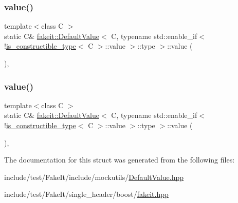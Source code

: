 \subsubsection{\texorpdfstring{value()}{value()}\hspace{0.1cm}{\footnotesize\ttfamily [8/9]}}
{\footnotesize\ttfamily template$<$class C $>$ \\
static C\& \mbox{\hyperlink{structfakeit_1_1DefaultValue}{fakeit\+::\+Default\+Value}}$<$ C, typename std\+::enable\+\_\+if$<$!\mbox{\hyperlink{structfakeit_1_1is__constructible__type}{is\+\_\+constructible\+\_\+type}}$<$ C $>$\+::value $>$\+::type $>$\+::value (\begin{DoxyParamCaption}{ }\end{DoxyParamCaption})\hspace{0.3cm}{\ttfamily [inline]}, {\ttfamily [static]}}

\mbox{\label{structfakeit_1_1DefaultValue_3_01C_00_01typename_01std_1_1enable__if_3_9is__constructible__type_237d75e2cfb810085e1504a1340d5949_ace6890104d79eccdf278ceb3b8d1d887}} 
\subsubsection{\texorpdfstring{value()}{value()}\hspace{0.1cm}{\footnotesize\ttfamily [9/9]}}
{\footnotesize\ttfamily template$<$class C $>$ \\
static C\& \mbox{\hyperlink{structfakeit_1_1DefaultValue}{fakeit\+::\+Default\+Value}}$<$ C, typename std\+::enable\+\_\+if$<$!\mbox{\hyperlink{structfakeit_1_1is__constructible__type}{is\+\_\+constructible\+\_\+type}}$<$ C $>$\+::value $>$\+::type $>$\+::value (\begin{DoxyParamCaption}{ }\end{DoxyParamCaption})\hspace{0.3cm}{\ttfamily [inline]}, {\ttfamily [static]}}



The documentation for this struct was generated from the following files\+:\begin{DoxyCompactItemize}
\item 
include/test/\+Fake\+It/include/mockutils/\mbox{\hyperlink{DefaultValue_8hpp}{Default\+Value.\+hpp}}\item 
include/test/\+Fake\+It/single\+\_\+header/boost/\mbox{\hyperlink{single__header_2boost_2fakeit_8hpp}{fakeit.\+hpp}}\end{DoxyCompactItemize}
